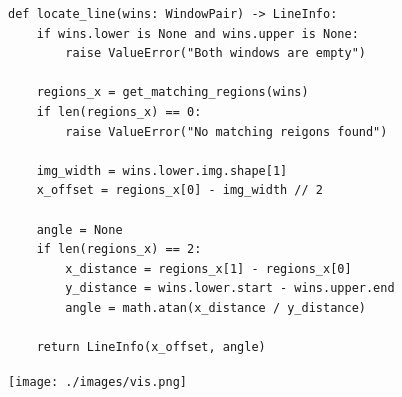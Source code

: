 \documentclass[11pt]{article}
\begin{document}
\begin{verbatim}
def locate_line(wins: WindowPair) -> LineInfo:
    if wins.lower is None and wins.upper is None:
        raise ValueError("Both windows are empty")

    regions_x = get_matching_regions(wins)
    if len(regions_x) == 0:
        raise ValueError("No matching reigons found")

    img_width = wins.lower.img.shape[1]
    x_offset = regions_x[0] - img_width // 2

    angle = None
    if len(regions_x) == 2:
        x_distance = regions_x[1] - regions_x[0]
        y_distance = wins.lower.start - wins.upper.end
        angle = math.atan(x_distance / y_distance)

    return LineInfo(x_offset, angle)
\end{verbatim}
\begin{center}
\texttt{[image: ./images/vis.png]}
\end{center}
\end{document}

